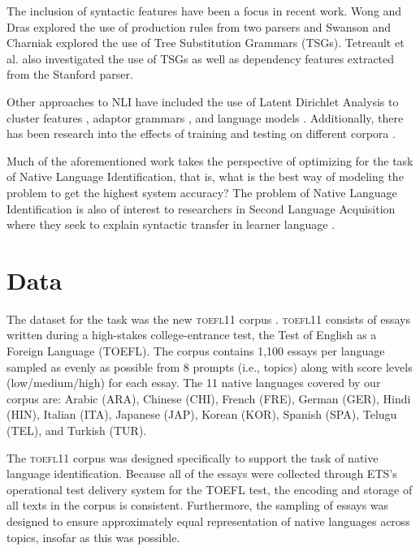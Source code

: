 \documentclass[11pt,letterpaper]{article}
\begin{document}
The inclusion of syntactic features have been a focus in recent work.
Wong and Dras  explored the use of production rules
from two parsers and Swanson and Charniak  explored
the use of Tree Substitution Grammars (TSGs).  Tetreault et al.  also investigated the use of TSGs as well as dependency
features extracted from the Stanford parser.

Other approaches to NLI have included the use of Latent Dirichlet Analysis
to cluster features \cite{Sze-MengJojoWongMarkDrasMarkJohnson:2011:ALTA2011},
adaptor grammars \cite{wong-dras-johnson:2012:EMNLP-CoNLL}, and
language models \cite{tetreault-EtAl:2012:PAPERS}.  Additionally, there has
been research into the effects of training and testing on different
corpora \cite{brooke2011native}.

Much of the aforementioned work takes the perspective of optimizing for the
task of Native Language Identification, that is, what is the best way of
modeling the problem to get the highest system accuracy?  The problem
of Native Language Identification is also of interest to researchers in
Second Language Acquisition where they seek to explain syntactic transfer
in learner language \cite{jarvis2012approaching}.

\section{Data}
\label{sec-data}
The dataset for the task was the new \textsc{toefl11} corpus
\cite{blanchard-tetreault-higgins-cahill-chodorow:2013:TOEFL11-RR}. \textsc{toefl11}
consists of essays written during a high-stakes college-entrance test, the Test
of English as a Foreign Language (TOEFL\textsuperscript{\textregistered}). The
corpus contains 1,100 essays per language sampled as evenly as possible from 8
prompts (i.e., topics) along with score levels (low/medium/high) for each essay.
The 11 native languages covered by our corpus are: Arabic (ARA), Chinese
(CHI), French (FRE), German (GER), Hindi (HIN), Italian (ITA), Japanese
(JAP), Korean (KOR), Spanish (SPA), Telugu (TEL), and Turkish (TUR).

The \textsc{toefl11} corpus was designed specifically to support the task of native
language identification.  Because all of the essays were collected through ETS's
operational test delivery system for the TOEFL\textsuperscript{\textregistered}
test, the encoding and storage of all texts in the corpus is consistent.
Furthermore, the sampling of essays was designed to ensure approximately equal
representation of native languages across topics, insofar as this was possible.
\end{document}
